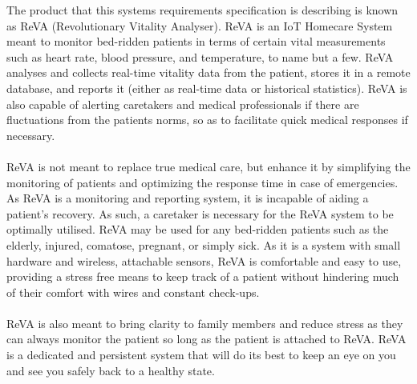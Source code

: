 The product that this systems requirements specification is describing is known as ReVA (Revolutionary Vitality Analyser).
ReVA is an IoT Homecare System meant to monitor bed-ridden patients in terms of certain vital measurements such as heart rate, blood pressure,
and temperature, to name but a few. ReVA analyses and collects real-time vitality data from the patient, stores it in a remote database, and
reports it (either as real-time data or historical statistics). ReVA is also capable of alerting caretakers and medical professionals if there 
are fluctuations from the patients norms, so as to facilitate quick medical responses if necessary.\\ \\ReVA is not meant to replace true medical 
care, but enhance it by simplifying the monitoring of patients and optimizing the response time in case of emergencies. As ReVA is a 
monitoring and reporting system, it is incapable of aiding a patient's recovery. As such, a caretaker is necessary for the ReVA system 
to be optimally utilised. ReVA may be used for any bed-ridden patients such as the elderly, injured, comatose, pregnant, or simply sick. As it 
is a system with small hardware and wireless, attachable sensors, ReVA is comfortable and easy to use, providing a stress free means to keep track 
of a patient without hindering much of their comfort with wires and constant check-ups.\\ \\ReVA is also meant to bring clarity to family members 
and reduce stress as they can always monitor the patient so long as the patient is attached to ReVA. ReVA is a dedicated and persistent 
system that will do its best to keep an eye on you and see you safely back to a healthy state. 
